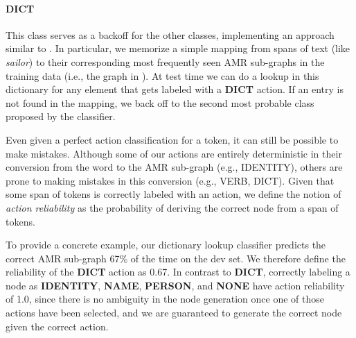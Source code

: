 \documentclass[11pt]{article}
\newcommand\w[1]{\textit{#1}} %
\begin{document}
\paragraph{DICT} This class serves as a backoff for the other classes, implementing
an approach similar to .
In particular, we memorize a simple mapping from spans of text
  (like \w{sailor}) to their corresponding most frequently seen AMR sub-graphs 
  in the training data (i.e., the graph in ).
At test time we can do a lookup in this dictionary for any element that gets 
  labeled with a \textbf{DICT} action. 
If an entry is not found in the mapping, we back off to the second most probable
  class proposed by the classifier.


%
%

Even given a perfect action classification for a token, it can still be possible to
  make mistakes.
Although some of our actions are entirely deterministic in their conversion
  from the word to the AMR sub-graph (e.g., IDENTITY), others are prone to
  making mistakes in this conversion (e.g., VERB, DICT).
Given that some span of tokens is correctly labeled with an action, we define the 
  notion of \textit{action reliability} as the probability of deriving the correct node from a span of tokens.

To provide a concrete example, our dictionary lookup classifier predicts the correct
  AMR sub-graph 67\% of the time on the dev set.
We therefore define the reliability of the \textbf{DICT} action as 0.67.
In contrast to \textbf{DICT}, correctly labeling a node as \textbf{IDENTITY}, \textbf{NAME}, \textbf{PERSON}, and \textbf{NONE} have 
  action reliability of 1.0, since there is no ambiguity in the node generation 
  once one of those actions have been selected, 
  and we are guaranteed to generate the correct node given the correct action.

\end{document}
